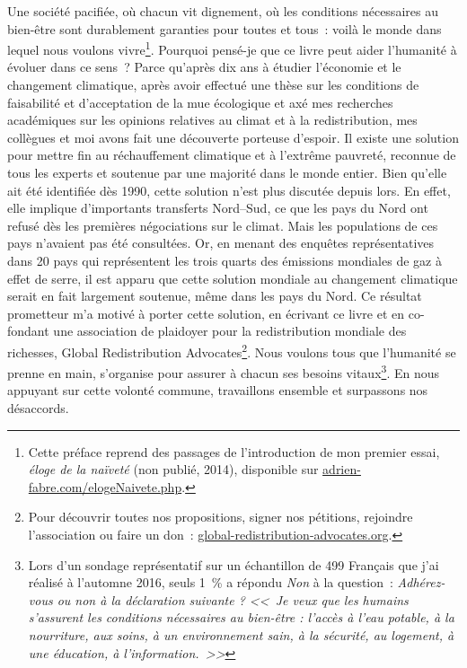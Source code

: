 \documentclass[a5paper,french,openany]{memoir}
\begin{document}
Une société pacifiée, où chacun vit dignement, où les conditions nécessaires au bien-être sont durablement garanties pour toutes et tous~: voilà le monde dans lequel nous voulons vivre\footnote{Cette préface reprend des passages de l'introduction de mon premier essai, \textit{éloge de la naïveté} (non publié, 2014), disponible sur \href{https://adrien-fabre.com/elogeNaivete.php}{adrien-fabre.com/elogeNaivete.php}.}. Pourquoi pensé-je que ce livre peut aider l'humanité à évoluer dans ce sens~? Parce qu'après dix ans à étudier l'économie et le changement climatique, après avoir effectué une thèse sur les conditions de faisabilité et d'acceptation de la mue écologique et axé mes recherches académiques sur les opinions relatives au climat et à la redistribution, mes collègues et moi avons fait une découverte porteuse d'espoir. Il existe une solution pour mettre fin au réchauffement climatique et à l'extrême pauvreté, reconnue de %
tous les experts et soutenue par une majorité dans le monde entier. 
Bien qu'elle ait été identifiée dès 1990, cette solution n'est plus discutée %
depuis lors. En effet, elle implique d'importants transferts Nord--Sud, ce que les pays du Nord ont refusé dès les premières négociations sur le climat. Mais les populations de ces pays n'avaient pas été consultées. Or, en menant des enquêtes représentatives dans 20 pays qui représentent les trois quarts des émissions mondiales de gaz à effet de serre, il est apparu que cette solution mondiale au changement climatique serait en fait largement soutenue, même dans les pays du Nord. 
Ce résultat prometteur m'a motivé à porter cette solution, en écrivant ce livre et en co-fondant une association de plaidoyer pour la redistribution mondiale des richesses, Global Redistribution Advocates\footnote{Pour découvrir toutes nos propositions, signer nos pétitions, rejoindre l'association ou faire un don~: \href{http://global-redistribution-advocates.org/}{global-redistribution-advocates.org}.}. Nous voulons tous que l'humanité se prenne en main, s'organise 
pour assurer à chacun ses besoins vitaux\footnote{Lors d'un sondage représentatif sur un échantillon de 499 %
Français que j'ai réalisé à l'automne 2016, seuls 1~\% a répondu \textit{Non} à la question~: \textit{Adhérez-vous ou non à la déclaration suivante ? <<~Je veux que les humains s'assurent les conditions nécessaires au bien-être : l'accès à l'eau potable, à la nourriture, aux soins, à un environnement sain, à la sécurité, au logement, à une éducation, à l'information.~>>}}. 
En nous appuyant sur cette volonté commune, travaillons ensemble et surpassons nos désaccords.
\end{document}
